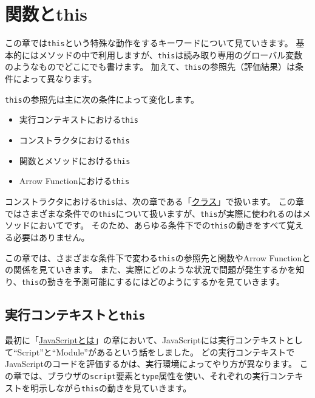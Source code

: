\hypertarget{function-this}{%
\chapter{関数とthis}\label{function-this}}
\thispagestyle{frontheadings}

この章では\texttt{this}という特殊な動作をするキーワードについて見ていきます。
基本的にはメソッドの中で利用しますが、\texttt{this}は読み取り専用のグローバル変数のようなものでどこにでも書けます。
加えて、\texttt{this}の参照先（評価結果）は条件によって異なります。

\texttt{this}の参照先は主に次の条件によって変化します。

\begin{itemize}
\item
  実行コンテキストにおける\texttt{this}
\item
  コンストラクタにおける\texttt{this}
\item
  関数とメソッドにおける\texttt{this}
\item
  Arrow Functionにおける\texttt{this}
\end{itemize}

コンストラクタにおける\texttt{this}は、次の章である「\hyperlink{class}{クラス}」で扱います。
この章ではさまざまな条件での\texttt{this}について扱いますが、\texttt{this}が実際に使われるのはメソッドにおいてです。
そのため、あらゆる条件下での\texttt{this}の動きをすべて覚える必要はありません。

この章では、さまざまな条件下で変わる\texttt{this}の参照先と関数やArrow
Functionとの関係を見ていきます。
また、実際にどのような状況で問題が発生するかを知り、\texttt{this}の動きを予測可能にするにはどのようにするかを見ていきます。

\hypertarget{execution-context-this}{%
\section{\texorpdfstring{実行コンテキストと\texttt{this}}{実行コンテキストとthis}}\label{execution-context-this}}

最初に「\hyperlink{what-is-javascript}{JavaScriptとは}」の章において、JavaScriptには実行コンテキストとして``Script''と``Module''があるという話をしました。
どの実行コンテキストでJavaScriptのコードを評価するかは、実行環境によってやり方が異なります。
この章では、ブラウザの\texttt{script}要素と\texttt{type}属性を使い、それぞれの実行コンテキストを明示しながら\texttt{this}の動きを見ていきます。

